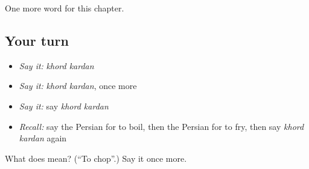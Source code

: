 \begin{grammarlens}[title={What you've built}]
One more word for this chapter.
\end{grammarlens}

\subsection*{Your turn}
\begin{itemize}
\raggedright
  \item \emph{Say it:} \emph{khord kardan}
  \item \emph{Say it:} \emph{khord kardan}, once more
  \item \emph{Say it:} say \emph{khord kardan}
  \item \emph{Recall:} say the Persian for to boil, then the Persian for to fry, then say \emph{khord kardan} again
\end{itemize}

\begin{tcolorbox}[breakable,colback=teal!4,colframe=teal!35!black,title={Before you move on}]
What does   mean? (\textquotedblleft{}To chop\textquotedblright{}.) Say it once more.
\end{tcolorbox}
